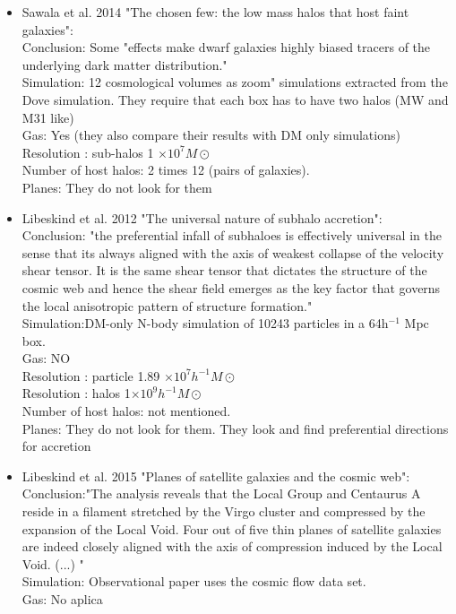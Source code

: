 \documentclass{emulateapj}
\begin{document}
\begin{itemize}
\item{Sawala et al. 2014 "The chosen few: the low mass halos that host faint galaxies":\\
Conclusion: Some "effects make dwarf galaxies highly biased
tracers of the underlying dark matter distribution."\\
Simulation: 12 cosmological volumes as zoom" simulations
extracted from the Dove simulation. They require that each box has to
have two halos (MW and M31 like)\\
Gas: Yes (they also compare their results with DM only simulations)\\
Resolution : sub-halos 1 $\times 10^7 M\odot$\\
Number of host halos:  2 times 12 (pairs of galaxies).\\
Planes: They do not look for them\\}

\item{Libeskind et al. 2012 "The universal nature of subhalo accretion":\\
Conclusion: "the preferential infall of subhaloes is effectively universal
in the sense that its always aligned with the axis of weakest collapse
of the velocity shear tensor. It is the same shear tensor that
dictates the structure of the cosmic web and hence the shear field
emerges as the key factor that governs the local anisotropic pattern
of structure formation."\\
Simulation:DM-only N-body simulation of 10243 particles in a
64h$^{-1}$ Mpc box.\\
Gas: NO\\
Resolution : particle 1.89 $\times 10^7 h^{-1} M\odot$\\
Resolution : halos 1$\times 10^9 h^{-1} M\odot$\\
Number of host halos:  not mentioned.\\
Planes: They do not look for them. They look and find preferential
directions for accretion\\}

\item{Libeskind et al. 2015 "Planes of satellite galaxies and the
cosmic web":\\
Conclusion:"The analysis reveals that the Local Group and Centaurus A
reside in a filament stretched by the Virgo cluster and compressed by
the expansion of the Local Void. Four out of five thin planes of
satellite galaxies are indeed closely aligned with the axis of
compression induced by the Local Void. (...) "\\ 
Simulation: Observational paper uses the cosmic flow data set.\\
Gas: No aplica\\
\\}


\end{itemize}
\end{document}
